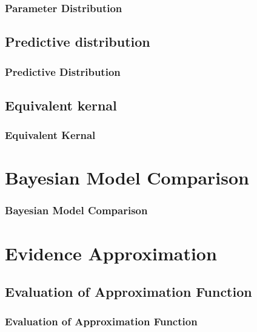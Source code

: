 \documentclass{beamer}
\begin{document}
\begin{frame}
\frametitle{Parameter Distribution}


\end{frame}

\subsection{Predictive distribution}

\begin{frame}
\frametitle{Predictive Distribution}

\end{frame}


\subsection{Equivalent kernal}

\begin{frame}
\frametitle{Equivalent Kernal}

\end{frame}


\section{Bayesian Model Comparison}

\begin{frame}
\frametitle{Bayesian Model Comparison}

\end{frame}



\section{Evidence Approximation}

\subsection{Evaluation of Approximation Function}

\begin{frame}
\frametitle{Evaluation of Approximation Function}

\end{frame}
\end{document}
